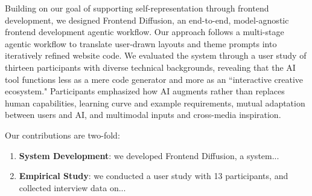 Building on our goal of supporting self-representation through frontend development, we designed Frontend Diffusion, an end-to-end, model-agnostic frontend development agentic workflow. Our approach follows a multi-stage agentic workflow to translate user-drawn layouts and theme prompts into iteratively refined website code. We evaluated the system through a user study of thirteen participants with diverse technical backgrounds, revealing that the AI tool functions less as a mere code generator and more as an ``interactive creative ecosystem." Participants emphasized how AI augments rather than replaces human capabilities, learning curve and example requirements, mutual adaptation between users and AI, and multimodal inputs and cross-media inspiration.

Our contributions are two-fold:

\begin{enumerate}
    \item \textbf{System Development}: we developed Frontend Diffusion, a system...
    \item \textbf{Empirical Study}: we conducted a user study with 13 participants, and collected interview data on...
\end{enumerate} 


